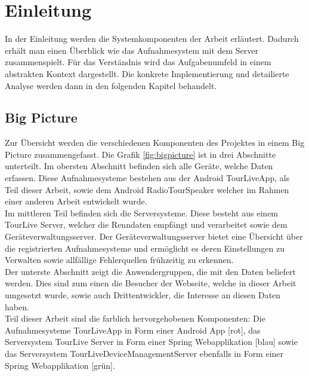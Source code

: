 \chapter{Einleitung}

In der Einleitung werden die Systemkomponenten der Arbeit erläutert. Dadurch erhält man einen Überblick wie das Aufnahmesystem mit dem Server zusammenspielt. Für das Verständnis wird das Aufgabenumfeld in einem abstrakten Kontext dargestellt. Die konkrete Implementierung und detailierte Analyse werden dann in den folgenden Kapitel behandelt.

\section{Big Picture}
Zur Übersicht werden die verschiedenen Komponenten des Projektes in einem Big Picture zusammengefasst. Die Grafik \ref{fig:bigpicture} ist in drei Abschnitte unterteilt. Im obersten Abschnitt befinden sich alle Geräte, welche Daten erfassen. Diese Aufnahmesysteme bestehen aus der Android TourLiveApp, als Teil dieser Arbeit, sowie dem Android RadioTourSpeaker welcher im Rahmen einer anderen Arbeit entwickelt wurde.\\
Im mittleren Teil befinden sich die Serversysteme. Diese besteht aus einem TourLive Server, welcher die Renndaten empfängt und verarbeitet sowie dem Geräteverwaltungsserver. Der Geräteverwaltungsserver bietet eine Übersicht über die registrierten Aufnahmesysteme und ermöglicht es deren Einstellungen zu Verwalten sowie allfällige Fehlerquellen frühzeitig zu erkennen.\\
Der unterste Abschnitt zeigt die Anwendergruppen, die mit den Daten beliefert werden. Dies sind zum einen die Besucher der Webseite, welche in dieser Arbeit umgesetzt wurde, sowie auch Drittentwickler, die Interesse an diesen Daten haben.\\
Teil dieser Arbeit sind die farblich hervorgehobenen Komponenten: Die Aufnahmesysteme TourLiveApp in Form einer Android App [rot], das Serversystem TourLive Server in Form einer Spring Webapplikation [blau] sowie das Serversystem TourLiveDeviceManagementServer ebenfalls in Form einer Spring Webapplikation [grün].

